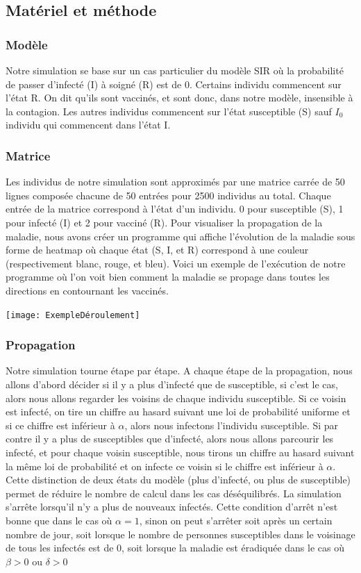 \documentclass[10pt]{article}
\begin{document}
\subsection{Matériel et méthode}
\subsubsection{Modèle}
Notre simulation se base sur un cas particulier du modèle SIR où la probabilité de passer d'infecté (I) à soigné (R) est de 0. Certains individu commencent sur l'état R. On dit qu'ils sont vaccinés, et sont donc, dans notre modèle, insensible à la contagion. Les autres individus commencent sur l'état susceptible (S) sauf $I_0$ individu qui commencent dans l'état I.
\subsubsection{Matrice}
Les individus de notre simulation sont approximés par une matrice carrée de 50 lignes composée chacune de 50 entrées pour 2500 individus au total. Chaque entrée de la matrice correspond à l'état d'un individu. 0 pour susceptible (S), 1 pour infecté (I) et 2 pour vacciné (R). Pour visualiser la propagation de la maladie, nous avons créer un programme qui affiche l'évolution de la maladie sous forme de heatmap où chaque état (S, I, et R) correspond à une couleur (respectivement blanc, rouge, et bleu). Voici un exemple de l'exécution de notre programme où l'on voit bien comment la maladie se propage dans toutes les directions en contournant les vaccinés.
\begin{center}
\texttt{[image: ExempleDéroulement]}
\end{center}

\subsubsection{Propagation}
Notre simulation tourne étape par étape. A chaque étape de la propagation, nous allons d'abord décider si il y a plus d'infecté que de susceptible, si c'est le cas, alors nous allons regarder les voisins de chaque individu susceptible. Si ce voisin est infecté, on tire un chiffre au hasard suivant une loi de probabilité uniforme et si ce chiffre est inférieur à $\alpha$, alors nous infectons l'individu susceptible. Si par contre il y a plus de susceptibles que d'infecté, alors nous allons parcourir les infecté, et pour chaque voisin susceptible, nous tirons un chiffre au hasard suivant la même loi de probabilité et on infecte ce voisin si le chiffre est inférieur à $\alpha$. Cette distinction de deux états du modèle (plus d'infecté, ou plus de susceptible) permet de réduire le nombre de calcul dans les cas déséquilibrés.
La simulation s'arrête lorsqu'il n'y a plus de nouveaux infectés. Cette condition d'arrêt n'est bonne que dans le cas où $\alpha = 1$, sinon on peut s'arrêter soit après un certain nombre de jour, soit lorsque le nombre de personnes susceptibles dans le voisinage de tous les infectés est de 0, soit lorsque la maladie est éradiquée dans le cas où $\beta > 0$ ou $\delta > 0 $
\end{document}

